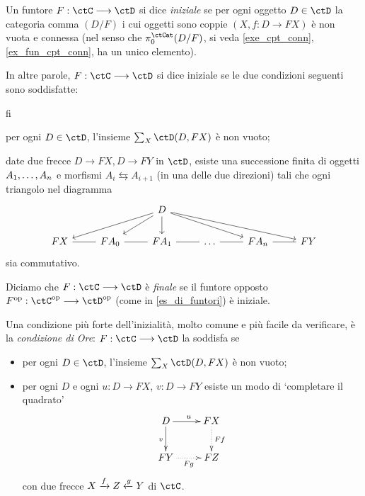 \begin{definition}\label{def_fun_initfin}
	Un funtore \(F : \ctC\fun\ctD\) si dice \emph{iniziale} se per ogni oggetto \(D\in\ctD\) la categoria comma \((D/F)\) i cui oggetti sono coppie \((X,f : D\to FX)\) è non vuota e connessa (nel senso che \(\pi_0^\ctCat(D/F)\), si veda \ref{exe_cpt_conn}, \ref{ex_fun_cpt_conn}, ha un unico elemento).

	In altre parole, \(F : \ctC\fun\ctD\) si dice iniziale se le due condizioni seguenti sono soddisfatte:
	\begin{enumtag}{fi}
		\item \label{fi_1} per ogni \(D\in\ctD\), l'insieme \(\sum_X\Hom\ctD(D,FX)\) è non vuoto;
		\item \label{fi_2} date due frecce \(D\to FX, D\to FY\) in \(\ctD\), esiste una successione finita di oggetti \(\tup An,\) e morfismi \(A_i \leftrightarrows A_{i+1}\) (in una delle due direzioni) tali che ogni triangolo nel diagramma
		\[\begin{tikzcd}
				&& D \\
				FX & {FA_0} & {FA_1} & \dots & {FA_n} & FY
				\arrow[from=1-3, to=2-1]
				\arrow[from=1-3, to=2-2]
				\arrow[from=1-3, to=2-3]
				\arrow[from=1-3, to=2-5]
				\arrow[from=1-3, to=2-6]
				\arrow[no head, from=2-1, to=2-2]
				\arrow[no head, from=2-2, to=2-3]
				\arrow[no head, from=2-3, to=2-4]
				\arrow[no head, from=2-4, to=2-5]
				\arrow[no head, from=2-5, to=2-6]
			\end{tikzcd}\]
		sia commutativo.
	\end{enumtag}
	Diciamo che \(F : \ctC\fun\ctD\) è \emph{finale} se il funtore opposto \(F^\op : \ctC^\op\fun\ctD^\op\) (come in \ref{es_di_funtori}) è iniziale.
\end{definition}
\begin{remark}\label{condizione_ore}
	Una condizione più forte dell'inizialità, molto comune e più facile da verificare, è la \emph{condizione di Ore}: \(F : \ctC\fun\ctD\) la soddisfa se
	\begin{itemize}
		\item per ogni \(D\in\ctD\), l'insieme \(\sum_X\Hom\ctD(D,FX)\) è non vuoto;
		\item per ogni \(D\) e ogni \(u : D\to FX\), \(v : D\to FY\) esiste un modo di `completare il quadrato'
		      \[\xymatrix{
				      D\ar[r]^u\ar[d]_v & FX \ar@{.>}[d]^{Ff}\\
				      FY \ar@{.>}[r]_{Fg} & FZ
			      }\]
		      con due frecce \(X \xrightarrow{f}Z \xleftarrow{g} Y\) di \(\ctC\).
	\end{itemize}
\end{remark}
